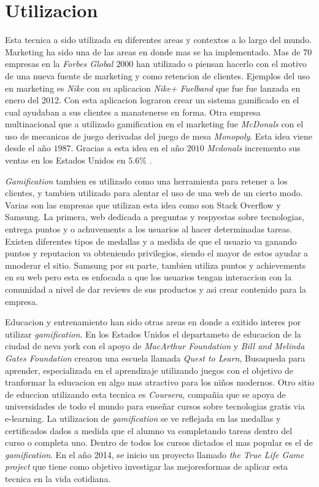 \section{Utilizacion}

Esta tecnica a sido utilizada en diferentes areas y contextos a lo largo del mundo. Marketing ha sido una 
de las areas en donde mas se ha implementado. Mas de 70 empresas en la \emph{Forbes Global $2000$} han
utilizado o piensan hacerlo con el motivo de una nueva fuente de marketing y como retencion de 
clientes\cite{Gam:Util:1}. Ejemplos del uso en marketing es \emph{Nike} con su aplicacion \emph{Nike+ Fuelband} que
fue fue lanzada en enero del 2012\cite{Gam:Util:2}. Con esta aplicacion lograron crear un sistema 
gamificado en el cual ayudaban a sus clientes a manatenerse en forma. Otra empresa multinacional que a utilizado
gamification en el marketing fue \emph{McDonals} con el uso de mecanicas de juego derivadas del juego de mesa 
\emph{Monopoly}. Esta idea viene desde el año $1987$. Gracias a esta idea en el año $2010$ \emph{Mcdonals} 
incremento sus ventas en los Estados Unidos en $5.6\%$ \cite{Gam:Util:2}.


\emph{Gamification} tambien es utilizado como una herramienta para retener a los clientes, y tambien utilizado 
para alentar el uso de una web de un cierto modo. Varias son las empresas que utilizan esta idea como son 
Stack Overflow y Samsung. La primera, web dedicada a preguntas y respyestas sobre tecnologias, entrega puntos y o 
achuvements a los usuarios al hacer determinadas tareas. Existen diferentes tipos de medallas y a medida de que el usuario va ganando puntos y reputacion va obteniendo privilegios, siendo el mayor de estos ayudar a mnoderar el sitio.
Samsung por su parte, tambien utiliza puntos y achievements en su web pero esta es enfocada a que los usuarios 
tengan interaccion con la comunidad a nivel de dar reviews de sus productos y asi crear contenido para la
empresa\cite{Gam:Util:3}.

Educacion y entrenamiento han sido otras areas en donde a exitido interes por utilizar \emph{gamification}. En los
 Estados Unidos el departameto de educacion de la ciudad de neva york con el apoyo de \emph{MacArthur Foundation} y
\emph{Bill and Melinda Gates Foundation} crearon una escuela llamada \emph{Quest to Learn}, Busaqueda para aprender,
especializada en el aprendizaje utilizando juegos con el objetivo de tranformar la educacion en algo mas atractivo
para los niños modernos\cite{Gam:Util:4}. Otro sitio de educcion utilizando esta tecnica 
es \emph{Coursera}, compañia que se apoya de universidades de todo el mundo para enseñar
cursos sobre tecnologias gratis via e-learning. La utilizacion de \emph{gamification}
se ve reflejada en las medallas y certificados dados a medida que el alumno va completando
tareas dentro del curso o completa uno. Dentro de todos los cursos dictados el mas popular es
el de \emph{gamification}\cite{Gam:Util:5}. En el año 2014, se inicio un proyecto llamado
\emph{the True Life Game project} que tiene como objetivo investigar las mejoresformas de
aplicar esta tecnica en la vida cotidiana.

